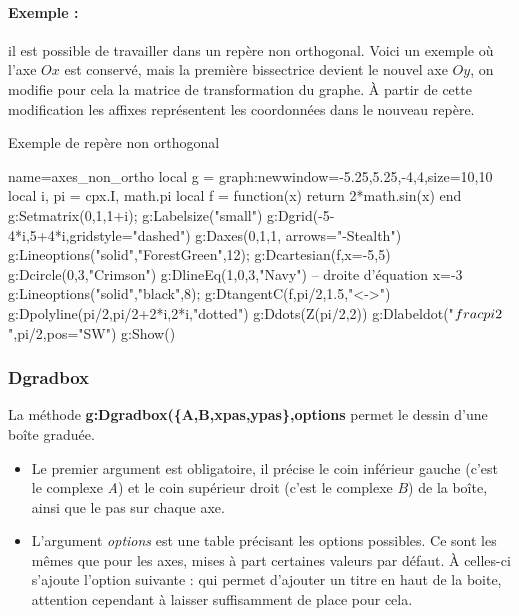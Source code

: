 \paragraph{Exemple : } il est possible de travailler dans un repère non orthogonal. Voici un exemple où l'axe $Ox$ est conservé, mais la première bissectrice devient le nouvel axe $Oy$, on modifie pour cela la matrice de transformation du graphe. À partir de cette modification les affixes représentent les coordonnées dans le nouveau repère.
\begin{demo}{Exemple de repère non orthogonal}
\begin{luadraw}{name=axes_non_ortho}
local g = graph:new{window={-5.25,5.25,-4,4},size={10,10}}
local i, pi = cpx.I, math.pi
local f = function(x) return 2*math.sin(x) end
g:Setmatrix({0,1,1+i}); g:Labelsize("small")
g:Dgrid({-5-4*i,5+4*i},{gridstyle="dashed"})
g:Daxes({0,1,1}, {arrows="-Stealth"})
g:Lineoptions("solid","ForestGreen",12); g:Dcartesian(f,{x={-5,5}})
g:Dcircle(0,3,"Crimson")
g:DlineEq(1,0,3,"Navy") -- droite d'équation x=-3
g:Lineoptions("solid","black",8); g:DtangentC(f,pi/2,1.5,"<->")
g:Dpolyline({pi/2,pi/2+2*i,2*i},"dotted")
g:Ddots(Z(pi/2,2))
g:Dlabeldot("$\\frac{\\pi}2$",pi/2,{pos="SW"})
g:Show()
\end{luadraw}
\end{demo}

\subsubsection{Dgradbox}

La méthode \textbf{g:Dgradbox(\{A,B,xpas,ypas\},options} permet le dessin d'une boîte graduée.
\begin{itemize}
    \item Le premier argument est obligatoire, il précise le coin inférieur gauche (c'est le complexe \emph{A}) et le coin supérieur droit (c'est le complexe $B$) de la boîte, ainsi que le pas sur chaque axe.
    \item L'argument \emph{options} est une table précisant les options possibles. Ce sont les mêmes que pour les axes, mises à part certaines valeurs par défaut. À celles-ci s'ajoute l'option suivante :  qui permet d'ajouter un titre en haut de la boite, attention cependant à laisser suffisamment de place pour cela.
\end{itemize}

